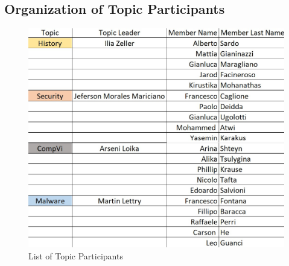\documentclass[a4paper,10pt]{article}
\begin{document}
\newpage
\vspace{1cm}
\subsection*{Organization of Topic Participants}
\begin{figure}[h!]
\includegraphics[height=0.52\paperheight, center]{subtopic_members.jpg}
\caption{List of Topic Participants}
\end{figure}
\end{document}
